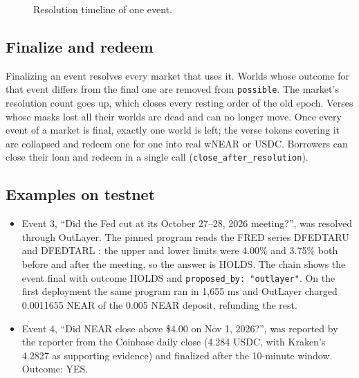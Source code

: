 \documentclass[11pt,a4paper]{article}
\newcommand{\code}[1]{\texttt{\small #1}}
\begin{document}
\begin{figure}[t]
\centering
{}
\caption{Resolution timeline of one event.}
\label{fig:timeline}
\end{figure}

\subsection{Finalize and redeem}

Finalizing an event resolves every market that uses it. Worlds whose outcome for that event differs from the final
one are removed from \code{possible}. The market's resolution count goes up, which closes every resting order of the
old epoch. Verses whose masks lost all their worlds are dead and can no longer move. Once every event of a market is
final, exactly one world is left; the verse tokens covering it are collapsed and redeem one for one into real wNEAR
or USDC. Borrowers can close their loan and redeem in a single call (\code{close\_after\_resolution}).

\subsection{Examples on testnet}

\begin{itemize}
\item Event 3, ``Did the Fed cut at its October 27--28, 2026 meeting?'', was resolved through OutLayer. The pinned
program reads the FRED series DFEDTARU and DFEDTARL \cite{fred}: the upper and lower limits were 4.00\% and 3.75\%
both before and after the meeting, so the answer is \textsf{HOLDS}. The chain shows the event final with outcome \textsf{HOLDS} and
\code{proposed\_by: "outlayer"}. On the first deployment the same program ran in 1,655 ms and OutLayer charged
0.0011655 NEAR of the 0.005 NEAR deposit, refunding the rest.
\item Event 4, ``Did NEAR close above \$4.00 on Nov 1, 2026?'', was reported by the reporter from the Coinbase daily
close (4.284 USDC, with Kraken's 4.2827 as supporting evidence) and finalized after the 10-minute window. Outcome:
\textsf{YES}.
\end{itemize}
\end{document}
